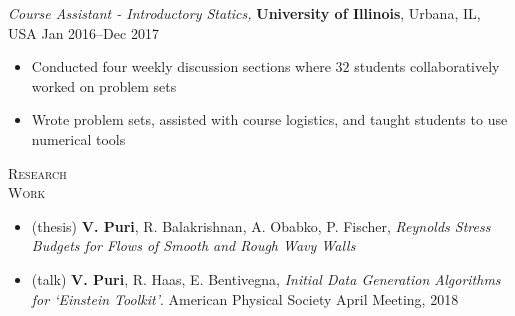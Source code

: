 \documentclass[10pt]{article}
\begin{document}
\begin{multicols}{2}
\vspace{0.5em}
%
{\sl Course Assistant - Introductory Statics,} \textbf{University of Illinois}, Urbana, IL, USA \hfill Jan 2016--Dec 2017

\vspace{-1.75em}
\begin{itemize}[label=-]
    \setlength\itemsep{-0.25em}
    \item Conducted four weekly discussion sections where $32$ students collaboratively worked on problem sets
    \item Wrote problem sets, assisted with course logistics, and taught students to use numerical tools
\end{itemize}
\vspace{-2.0em}

\end{multicols}
\vspace{-1.5em}
\begin{multicols}{2}
\textsc{\small Research \\ Work}
\columnbreak

\vspace{-1.75em}
\begin{itemize}[label= ]
    \setlength{\itemindent}{-2.5em}
    \setlength\itemsep{-1.0\itemsep}
    \item (thesis) \textbf{V. Puri}, R. Balakrishnan, A. Obabko, P. Fischer, {\sl Reynolds Stress Budgets for Flows of Smooth and Rough Wavy Walls}
    \item (talk) \textbf{V. Puri}, R. Haas, E. Bentivegna, {\sl Initial Data Generation Algorithms for `Einstein Toolkit'}. American Physical Society April Meeting, 2018
\end{itemize}
\vspace{-2.0em}

\end{multicols}
\vspace{-1.5em}
\end{document}
